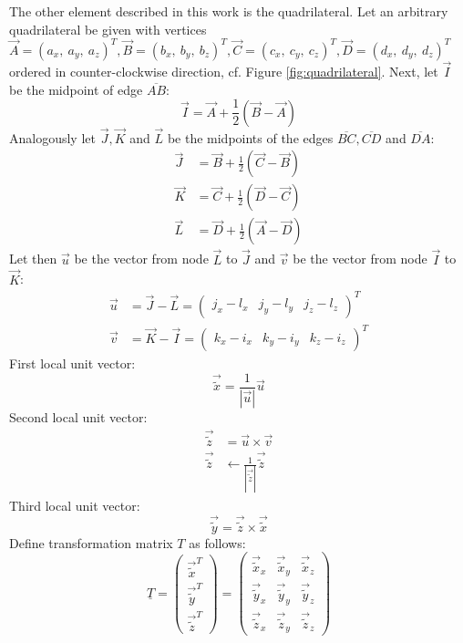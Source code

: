   The other element described in this work is the quadrilateral. Let an arbitrary quadrilateral be given with vertices $\vec{A} = (a_x,\ a_y,\ a_z)^T, \vec{B} = (b_x,\ b_y,\ b_z)^T, \vec{C} = (c_x,\ c_y,\ c_z)^T, \vec{D} = (d_x,\ d_y,\ d_z)^T$ ordered in counter-clockwise direction, cf. Figure \ref{fig:quadrilateral}. Next, let $\vec{I}$ be the midpoint of edge $\overline{AB}$:
  \begin{equation*}
   \vec{I} = \vec{A} + \frac{1}{2}\left( \vec{B}-\vec{A}\right)
  \end{equation*}
  Analogously let $\vec{J}, \vec{K}$ and $\vec{L}$ be the midpoints of the edges $\overline{BC}, \overline{CD}$ and $\overline{DA}$:
  \begin{align*}
   \vec{J} &= \vec{B} + \frac{1}{2}\left( \vec{C}-\vec{B}\right) \\
   \vec{K} &= \vec{C} + \frac{1}{2}\left( \vec{D}-\vec{C}\right) \\
   \vec{L} &= \vec{D} + \frac{1}{2}\left( \vec{A}-\vec{D}\right)
  \end{align*}
  Let then $\vec{u}$ be the vector from node $\vec{L}$ to $\vec{J}$ and $\vec{v}$ be the vector from node $\vec{I}$ to $\vec{K}$:
  \begin{align*}
   \vec{u} &= \vec{J}-\vec{L} = \begin{pmatrix}
   j_x-l_x & j_y-l_y & j_z-l_z
   \end{pmatrix}^T\\
   \vec{v} &= \vec{K}-\vec{I} = \begin{pmatrix}
   k_x-i_x & k_y-i_y & k_z-i_z
   \end{pmatrix}^T
  \end{align*}
  First local unit vector:
  \begin{equation*}
   \vec{\tilde{x}} = \frac{1}{\left|\vec{u}\right|}\vec{u}
  \end{equation*}
  Second local unit vector:
  \begin{align*}
   \vec{\tilde{z}} &= \vec{u} \times \vec{v}\\
   \vec{\tilde{z}} &\leftarrow \frac{1}{\left|\vec{\tilde{z}}\right|}\vec{\tilde{z}}
  \end{align*}
  Third local unit vector:
  \begin{equation*}
   \vec{\tilde{y}} = \vec{\tilde{z}} \times \vec{\tilde{x}}
  \end{equation*}
  Define transformation matrix $T$ as follows:
  \begin{equation}\label{eq:trafoT_quad}
   \underline{T} = \begin{pmatrix}
   \vec{\tilde{x}}^T\\ \vec{\tilde{y}}^T\\ \vec{\tilde{z}}^T
   \end{pmatrix} = \begin{pmatrix}
   \vec{\tilde{x}}_x & \vec{\tilde{x}}_y & \vec{\tilde{x}}_z\\ \vec{\tilde{y}}_x & \vec{\tilde{y}}_y & \vec{\tilde{y}}_z\\ \vec{\tilde{z}}_x & \vec{\tilde{z}}_y & \vec{\tilde{z}}_z
   \end{pmatrix}
  \end{equation}
